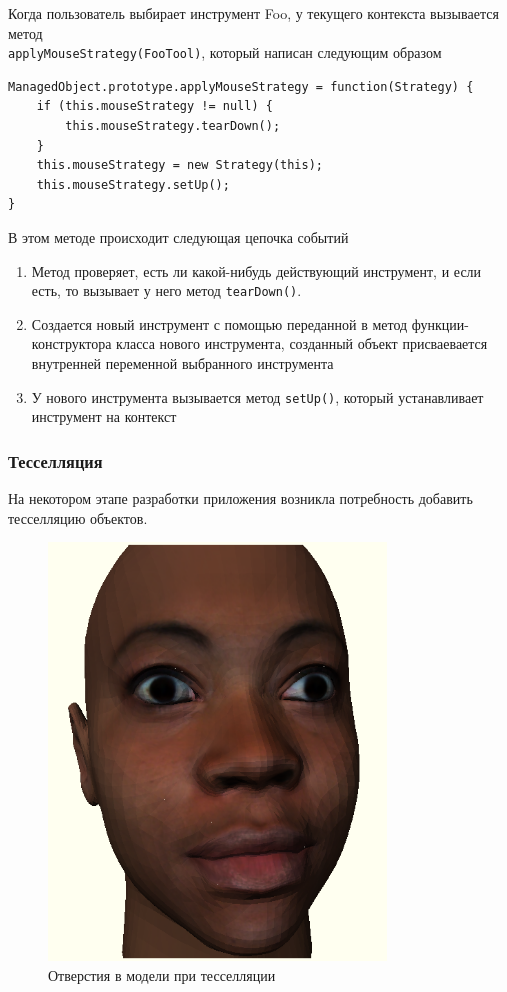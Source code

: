 \documentclass[12pt, a4paper]{article}
\begin{document}
Когда пользователь выбирает инструмент Foo, у текущего контекста вызывается метод \\
\texttt{applyMouseStrategy(FooTool)}, который написан следующим образом
\begin{lstlisting}
ManagedObject.prototype.applyMouseStrategy = function(Strategy) {
    if (this.mouseStrategy != null) {
        this.mouseStrategy.tearDown();
    }
    this.mouseStrategy = new Strategy(this);
    this.mouseStrategy.setUp();
}
\end{lstlisting}
В этом методе происходит следующая цепочка событий
\begin{enumerate}
    \item Метод проверяет, есть ли какой-нибудь действующий инструмент, и если
    есть, то вызывает у него метод \texttt{tearDown()}.
    \item Создается новый инструмент с помощью переданной в метод
    функции-конструктора класса нового инструмента, созданный объект
    присваевается внутренней переменной выбранного инструмента
    \item У нового инструмента вызывается метод \texttt{setUp()}, который
    устанавливает инструмент на контекст
\end{enumerate}

\subsubsection{Тесселляция}
На некотором этапе разработки приложения возникла потребность добавить
тесселляцию объектов.

\begin{figure}[htb]
\centering
\includegraphics[width=0.8\textwidth]{holes-in-model.png}
\caption{Отверстия в модели при тесселляции}
\label{fig:holes-in-model}
\end{figure}
\end{document}
